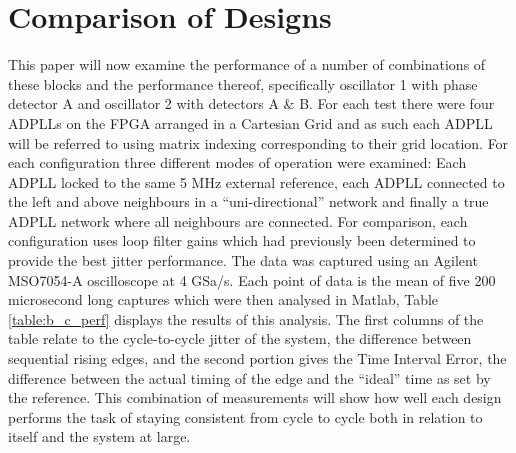 \documentclass[conference]{IEEEtran}
\begin{document}
\section{Comparison of Designs}
This paper will now examine the performance of a number of combinations of these blocks and the performance thereof, specifically oscillator 1 with phase detector A and oscillator 2 with detectors A \& B. For each test there were four ADPLLs on the FPGA arranged in a Cartesian Grid and as such each ADPLL will be referred to using matrix indexing corresponding to their grid location. For each configuration three different modes of operation were examined: Each ADPLL locked to the same 5 MHz external reference, each ADPLL connected to the left and above neighbours in a ``uni-directional'' network and finally a true ADPLL network where all neighbours are connected. For comparison, each configuration uses loop filter gains which had previously been determined to provide the best jitter performance. The data was captured using an Agilent MSO7054-A oscilloscope at 4 GSa/s. Each point of data is the mean of five 200 microsecond long captures which were then analysed in Matlab, Table \ref{table:b_c_perf} displays the results of this analysis.
The first columns of the table relate to the cycle-to-cycle jitter of the system, the difference between sequential rising edges, and the second portion gives the Time Interval Error, the difference between the actual timing of the edge and the ``ideal'' time as set by the reference. This combination of measurements will show how well each design performs the task of staying consistent from cycle to cycle both in relation to itself and the system at large.
\end{document}
